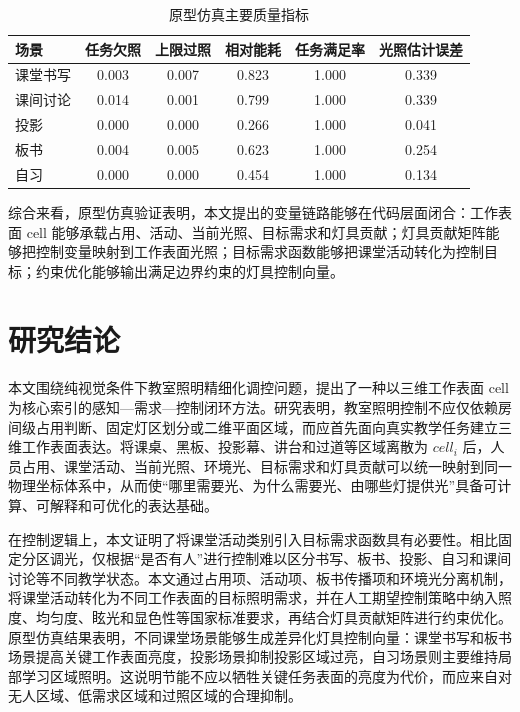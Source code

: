 \documentclass[UTF8,a4paper,zihao=-4]{ctexart}
\begin{document}
\begin{table}[H]
  \centering
  \caption{原型仿真主要质量指标}
  \label{tab:quality-metrics}
  \begin{tabular}{lccccc}
    \toprule
    场景 & 任务欠照 & 上限过照 & 相对能耗 & 任务满足率 & 光照估计误差 \\
    \midrule
    课堂书写 & 0.003 & 0.007 & 0.823 & 1.000 & 0.339 \\
    课间讨论 & 0.014 & 0.001 & 0.799 & 1.000 & 0.339 \\
    投影 & 0.000 & 0.000 & 0.266 & 1.000 & 0.041 \\
    板书 & 0.004 & 0.005 & 0.623 & 1.000 & 0.254 \\
    自习 & 0.000 & 0.000 & 0.454 & 1.000 & 0.134 \\
    \bottomrule
  \end{tabular}
\end{table}

综合来看，原型仿真验证表明，本文提出的变量链路能够在代码层面闭合：工作表面 cell 能够承载占用、活动、当前光照、目标需求和灯具贡献；灯具贡献矩阵能够把控制变量映射到工作表面光照；目标需求函数能够把课堂活动转化为控制目标；约束优化能够输出满足边界约束的灯具控制向量。

\section{研究结论}

本文围绕纯视觉条件下教室照明精细化调控问题，提出了一种以三维工作表面 cell 为核心索引的感知—需求—控制闭环方法。研究表明，教室照明控制不应仅依赖房间级占用判断、固定灯区划分或二维平面区域，而应首先面向真实教学任务建立三维工作表面表达。将课桌、黑板、投影幕、讲台和过道等区域离散为 $cell_i$ 后，人员占用、课堂活动、当前光照、环境光、目标需求和灯具贡献可以统一映射到同一物理坐标体系中，从而使“哪里需要光、为什么需要光、由哪些灯提供光”具备可计算、可解释和可优化的表达基础。

在控制逻辑上，本文证明了将课堂活动类别引入目标需求函数具有必要性。相比固定分区调光，仅根据“是否有人”进行控制难以区分书写、板书、投影、自习和课间讨论等不同教学状态。本文通过占用项、活动项、板书传播项和环境光分离机制，将课堂活动转化为不同工作表面的目标照明需求，并在人工期望控制策略中纳入照度、均匀度、眩光和显色性等国家标准要求，再结合灯具贡献矩阵进行约束优化。原型仿真结果表明，不同课堂场景能够生成差异化灯具控制向量：课堂书写和板书场景提高关键工作表面亮度，投影场景抑制投影区域过亮，自习场景则主要维持局部学习区域照明。这说明节能不应以牺牲关键任务表面的亮度为代价，而应来自对无人区域、低需求区域和过照区域的合理抑制。
\end{document}
